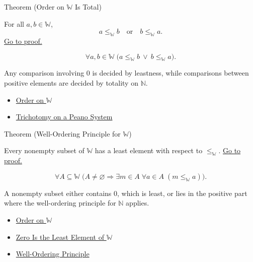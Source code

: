 \begin{theorembox}{Theorem (Order on \texorpdfstring{$\mathbb{W}$}{W} Is Total)}
\begin{theorem}
\label{thm:order-on-w-total}
For all $a,b\in\mathbb{W}$,
\[
a\leq_{\mathbb{W}}b
\quad\text{or}\quad
b\leq_{\mathbb{W}}a.
\]
\hyperref[prf:order-on-w-total]{Go to proof.}
\end{theorem}
\end{theorembox}

\begin{remark*}
\[
\forall a,b\in\mathbb{W}\;
\bigl(a\leq_{\mathbb{W}}b\ \vee\ b\leq_{\mathbb{W}}a\bigr).
\]
\end{remark*}

\begin{remark*}[Interpretation]
Any comparison involving $0$ is decided by leastness, while comparisons
between positive elements are decided by totality on $\mathbb{N}$.
\end{remark*}

\begin{dependencies}
\begin{itemize}
  \item \hyperref[def:order-on-w]{Order on $\mathbb{W}$}
  \item \hyperref[thm:trichotomy-on-peano-system]{Trichotomy on a Peano System}
\end{itemize}
\end{dependencies}

\begin{theorembox}{Theorem (Well-Ordering Principle for \texorpdfstring{$\mathbb{W}$}{W})}
\begin{theorem}
\label{thm:well-ordering-principle-for-w}
Every nonempty subset of $\mathbb{W}$ has a least element with respect to
$\leq_{\mathbb{W}}$.
\hyperref[prf:well-ordering-principle-for-w]{Go to proof.}
\end{theorem}
\end{theorembox}

\begin{remark*}
\[
\forall A\subseteq\mathbb{W}\;
\bigl(A\neq\varnothing \Longrightarrow
\exists m\in A\;\forall a\in A\;(m\leq_{\mathbb{W}}a)\bigr).
\]
\end{remark*}

\begin{remark*}[Interpretation]
A nonempty subset either contains $0$, which is least, or lies in the positive
part where the well-ordering principle for $\mathbb{N}$ applies.
\end{remark*}

\begin{dependencies}
\begin{itemize}
  \item \hyperref[def:order-on-w]{Order on $\mathbb{W}$}
  \item \hyperref[thm:zero-least-element-of-w]{Zero Is the Least Element of $\mathbb{W}$}
  \item \hyperref[thm:well-ordering-principle]{Well-Ordering Principle}
\end{itemize}
\end{dependencies}
